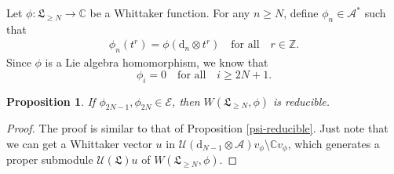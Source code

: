 \documentclass[12pt, a4paper]{amsart}
\newcommand{\C}{\mathbb{C}}
\newcommand{\Z}{\mathbb Z}
\newcommand{\rd}{\mathrm{d}}
\newcommand{\U}{\mathcal{U}}
\theoremstyle{Theorem}
\theoremstyle{Theorem}
\newtheorem{proposition}[thm]{Proposition}
\numberwithin{equation}{section}
\begin{document}
Let $\phi:\mathfrak{L}_{\geq N}\rightarrow\C$ be a Whittaker function.
For any $n\geq N$, define $\phi_{n}\in\mathcal{A}^*$ such that
\begin{align}\phi_{n}(t^{r})=\phi(\rd_{n}\otimes t^{r})\quad \text{for all}\quad r\in\Z.\end{align}
Since $\phi$ is a Lie algebra homomorphism, we know that
\[\phi_{i}=0\quad\text{for all}\quad i\geq2N+1.\]

\begin{proposition}
If $\phi_{2N-1},\phi_{2N}\in\mathcal{E}$, then $W(\mathfrak{L}_{\geq N},\phi)$ is reducible.
\end{proposition}
\begin{proof}
The proof is similar to that of Proposition \ref{psi-reducible}. Just note that we can get a
Whittaker vector $u$ in $\U(\rd_{N-1}\otimes\mathcal{A})v_{\phi}\setminus\C v_{\phi}$,
which generates a proper submodule $\U(\mathfrak{L})u$ of $W(\mathfrak{L}_{\geq N},\phi)$.
\end{proof}
\end{document}
